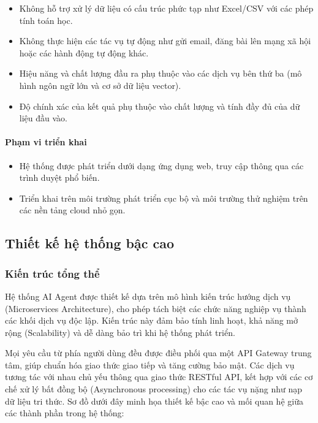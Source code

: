 \begin{itemize}
\item
  Không hỗ trợ xử lý dữ liệu có cấu trúc phức tạp như Excel/CSV với các
  phép tính toán học.
\item
  Không thực hiện các tác vụ tự động như gửi email, đăng bài lên mạng xã
  hội hoặc các hành động tự động khác.
\item
  Hiệu năng và chất lượng đầu ra phụ thuộc vào các dịch vụ bên thứ ba
  (mô hình ngôn ngữ lớn và cơ sở dữ liệu vector).
\item
  Độ chính xác của kết quả phụ thuộc vào chất lượng và tính đầy đủ của
  dữ liệu đầu vào.
\end{itemize}

\paragraph{Phạm vi triển khai}\label{phux1ea1m-vi-triux1ec3n-khai}

\begin{itemize}
\item
  Hệ thống được phát triển dưới dạng ứng dụng web, truy cập thông qua
  các trình duyệt phổ biến.
\item
  Triển khai trên môi trường phát triển cục bộ và môi trường thử nghiệm
  trên các nền tảng cloud nhỏ gọn.
\end{itemize}

\subsection{Thiết kế hệ thống bậc
cao}\label{thiux1ebft-kux1ebf-hux1ec7-thux1ed1ng-bux1eadc-cao}

\subsubsection{Kiến trúc tổng
thể}\label{kiux1ebfn-truxfac-tux1ed5ng-thux1ec3}

Hệ thống AI Agent được thiết kế dựa trên mô hình kiến trúc hướng dịch vụ
(Microservices Architecture), cho phép tách biệt các chức năng nghiệp vụ
thành các khối dịch vụ độc lập. Kiến trúc này đảm bảo tính linh hoạt,
khả năng mở rộng (Scalability) và dễ dàng bảo trì khi hệ thống phát
triển.

Mọi yêu cầu từ phía người dùng đều được điều phối qua một API Gateway
trung tâm, giúp chuẩn hóa giao thức giao tiếp và tăng cường bảo mật. Các
dịch vụ tương tác với nhau chủ yếu thông qua giao thức RESTful API, kết
hợp với các cơ chế xử lý bất đồng bộ (Asynchronous processing) cho các
tác vụ nặng như nạp dữ liệu tri thức. Sơ đồ dưới đây minh họa thiết kế
bậc cao và mối quan hệ giữa các thành phần trong hệ thống:

